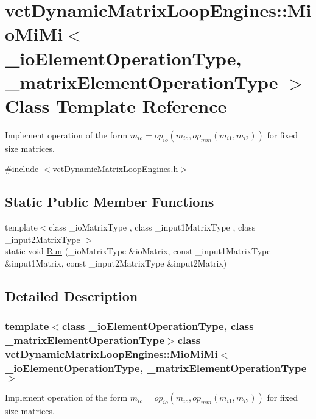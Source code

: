 \hypertarget{classvct_dynamic_matrix_loop_engines_1_1_mio_mi_mi}{}\section{vct\+Dynamic\+Matrix\+Loop\+Engines\+:\+:Mio\+Mi\+Mi$<$ \+\_\+io\+Element\+Operation\+Type, \+\_\+matrix\+Element\+Operation\+Type $>$ Class Template Reference}
\label{classvct_dynamic_matrix_loop_engines_1_1_mio_mi_mi}


Implement operation of the form $m_{io} = op_{io}(m_{io}, op_{mm}(m_{i1}, m_{i2}))$ for fixed size matrices.  




{\ttfamily \#include $<$vct\+Dynamic\+Matrix\+Loop\+Engines.\+h$>$}

\subsection*{Static Public Member Functions}
\begin{DoxyCompactItemize}
\item 
{\footnotesize template$<$class \+\_\+io\+Matrix\+Type , class \+\_\+input1\+Matrix\+Type , class \+\_\+input2\+Matrix\+Type $>$ }\\static void \hyperlink{classvct_dynamic_matrix_loop_engines_1_1_mio_mi_mi_a504e413cf784f3211d8e5c140df6c204}{Run} (\+\_\+io\+Matrix\+Type \&io\+Matrix, const \+\_\+input1\+Matrix\+Type \&input1\+Matrix, const \+\_\+input2\+Matrix\+Type \&input2\+Matrix)
\end{DoxyCompactItemize}


\subsection{Detailed Description}
\subsubsection*{template$<$class \+\_\+io\+Element\+Operation\+Type, class \+\_\+matrix\+Element\+Operation\+Type$>$class vct\+Dynamic\+Matrix\+Loop\+Engines\+::\+Mio\+Mi\+Mi$<$ \+\_\+io\+Element\+Operation\+Type, \+\_\+matrix\+Element\+Operation\+Type $>$}

Implement operation of the form $m_{io} = op_{io}(m_{io}, op_{mm}(m_{i1}, m_{i2}))$ for fixed size matrices. 

